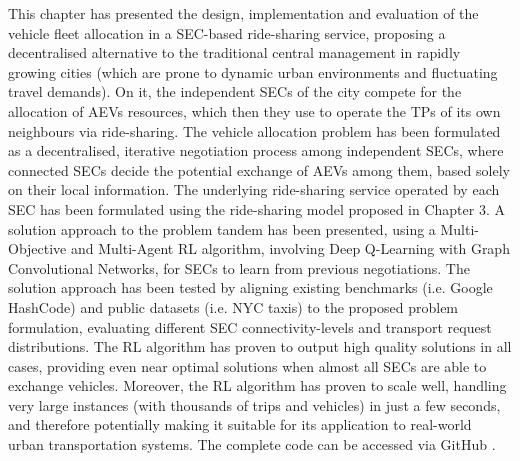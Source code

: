 This chapter has presented the design, implementation and evaluation of the vehicle fleet allocation in a SEC-based
ride-sharing service, proposing a decentralised alternative
to the traditional central management in rapidly growing cities
(which are prone to dynamic urban environments and fluctuating travel demands).
On it, the independent SECs of the city compete for the allocation of AEVs resources,
which then they use to operate the TPs of its own neighbours via ride-sharing.
The vehicle allocation
problem has been formulated as a decentralised, iterative negotiation process among independent SECs,
where connected SECs decide the potential exchange of AEVs among them, based solely on their local information.
The underlying ride-sharing service operated by each SEC has been formulated using the ride-sharing model proposed in Chapter 3.
A solution approach to the problem tandem has been presented, using a Multi-Objective and Multi-Agent
RL algorithm, involving Deep Q-Learning with Graph Convolutional Networks, for SECs to
learn from previous negotiations.
The solution approach has been tested by aligning existing benchmarks (i.e. Google HashCode) and public
datasets (i.e. NYC taxis) to the proposed problem formulation, evaluating different SEC connectivity-levels
and transport request distributions.
The RL algorithm has proven to output high quality solutions in all cases, providing even near optimal solutions
when almost all SECs are able to exchange vehicles. Moreover, the RL algorithm has proven to scale well,
handling very large instances (with thousands of trips and vehicles) in just a few seconds, and therefore
potentially making it suitable for its application to real-world urban transportation systems. The complete code can be accessed via GitHub \cite{chapter4code}.

